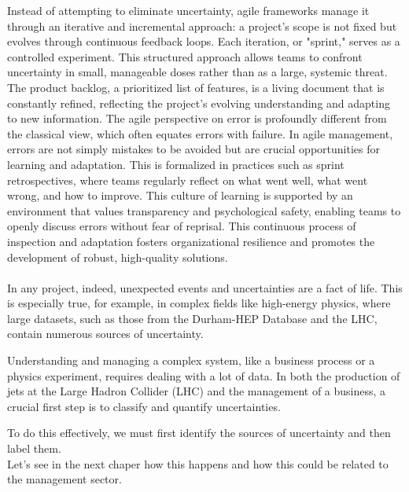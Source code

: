 \documentclass{article}
\begin{document}
Instead of attempting to eliminate uncertainty, agile frameworks manage it through an iterative and incremental approach: a project’s scope is not fixed but evolves through continuous feedback loops. Each iteration, or "sprint," serves as a controlled experiment. This structured approach allows teams to confront uncertainty in small, manageable doses rather than as a large, systemic threat. The product backlog, a prioritized list of features, is a living document that is constantly refined, reflecting the project’s evolving understanding and adapting to new information. The agile perspective on error is profoundly different from the classical view, which often equates errors with failure. In agile management, errors are not simply mistakes to be avoided but are crucial opportunities for learning and adaptation. This is formalized in practices such as sprint retrospectives, where teams regularly reflect on what went well, what went wrong, and how to improve. This culture of learning is supported by an environment that values transparency and psychological safety, enabling teams to openly discuss errors without fear of reprisal. This continuous process of inspection and adaptation fosters organizational resilience and promotes the development of robust, high-quality solutions.\\\\
In any project, indeed, unexpected events and uncertainties are a fact of life. This is especially true, for example, in complex fields like high-energy physics, where large datasets, such as those from the Durham-HEP Database and the LHC, contain numerous sources of uncertainty.  

Understanding and managing a complex system, like a business process or a physics experiment, requires dealing with a lot of data. In both the production of jets at the Large Hadron Collider (LHC) and the management of a business, a crucial first step is to classify and quantify uncertainties.

To do this effectively, we must first identify the sources of uncertainty and then label them.\\
Let's see in the next chaper how this happens and how this could be related to the management sector.
\end{document}
